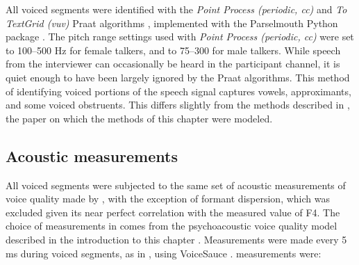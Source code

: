All voiced segments were identified with the \textit{Point Process (periodic, cc)} and \textit{To TextGrid (vuv)} Praat algorithms \citep{boersma_2021_praat}, implemented with the Parselmouth Python package \citep{jadoul_2018_parselmouth}. The pitch range settings used with \textit{Point Process (periodic, cc)} were set to 100--500 Hz for female talkers, and to 75--300 for male talkers. While speech from the interviewer can occasionally be heard in the participant channel, it is quiet enough to have been largely ignored by the Praat algorithms. This method of identifying voiced portions of the speech signal captures vowels, approximants, and some voiced obstruents. This differs slightly from the methods described in \citet{lee_2019_acoustic}, the paper on which the methods of this chapter were modeled. 

\subsection{Acoustic measurements}\label{ch3:sec:acoustic}
All voiced segments were subjected to the same set of acoustic measurements of voice quality made by \citet{lee_2019_acoustic}, with the exception of formant dispersion, which was excluded given its near perfect correlation with the measured value of F4. The choice of measurements in \citet{lee_2019_acoustic} comes from the psychoacoustic voice quality model described in the introduction to this chapter \citep{kreiman_2014_theory}. Measurements were made every 5 ms during voiced segments, as in \citet{lee_2019_acoustic}, using VoiceSauce \citep{shue_2011_voicesauce}.  measurements were: 

